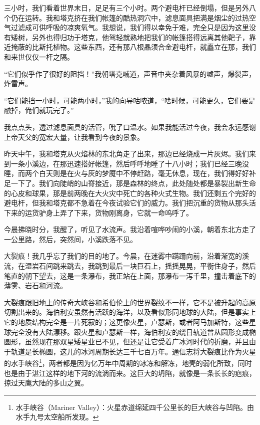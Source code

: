 \documentclass[AutoFakeBold=true]{book}
\begin{document}
三小时，我们看着世界末日，足足有三个小时。两个避电杆已经倒塌，但是另外八个仍在运转。我和塔克挤在我们帐篷的酷热洞穴中，滤息面具把满是烟尘的过热空气过滤成可供呼吸的凉爽氧气。我想说，我们得以幸免于难，完全只是因为这里没有矮树，另外也得归功于塔克，他驾轻就熟地把我们的帐篷搭得远离其他靶子，靠近掩蔽的比斯托植物。这些东西，还有那八根晶须合金避电杆，就矗立在那，我们和来世仅仅一杆之隔。

``它们似乎作了很好的阻挡！''我朝塔克喊道，声音中夹杂着风暴的嘘声，爆裂声，炸雷声。

``它们能挡一小时，可能两小时，''我的向导咕哝道，``啥时候，可能更久，它们要是融掉，俺们就玩完了。''

我点点头，透过滤息面具的活管，吮了口温水。如果我能活过今夜，我会永远感谢上帝天父的宽宏大量，让我看到今夜的景象。

\vspace*{1em}{\kaishu 第八十七日：}

昨天中午，我和塔克从火焰林的东北角走了出来，那边已经烧成一片灰烬。我们来到一条小溪边，在那迅速搭好帐篷，然后呼呼地睡了十八小时；我们已经三晚没睡，而两个白天则是在火与灰的梦魇中不停赶路，毫无休息，现在，我们得好好补足一下了。我们向陡峭的山脊接近，那是森林的终点，此处随处都是暴裂出新生命的心皮和球果，那是前两晚在大火灾中死亡的各种火式生物。我们还剩五个完好的避电杆，但我和塔克都不急着在今夜试验它们的威力。我们把沉重的货物从那头活下来的运货驴身上弄了下来，货物刚离身，它就一命呜呼了。

今晨拂晓时分，我醒了，听见了水流声。我沿着喧哗吵闹的小溪，朝着东北方走了一公里路，然后，突然间，小溪跌落不见。

大裂痕！我几乎忘了我们的目的地了。今晨，在迷雾中蹒跚向前，沿着渐宽的溪流，在湿岩石间跳来跳去，我跳到最后一块巨石上，摇摇晃晃，平衡住身子，然后笔直的朝下望去，这是一条瀑布，我正站在上面，那瀑布一泻千里，撞击着底下的薄雾、岩石和河流。

大裂痕跟旧地上的传奇大峡谷和希伯伦上的世界裂纹不一样，它不是被升起的高原切割出来的。海伯利安虽然有活跃的海洋，以及看似形同地球的大陆，但是事实上它的地质结构完全是一片死寂的；这更像火星，卢瑟斯，或者阿马加斯特，这些星球完全没有大陆漂移。跟火星和卢瑟斯一样，海伯利安的绕日轨道曾从圆形变成椭圆形，虽然现在那双星矮星业已不见，但还是让它受着广冰河时代的折磨，并且由于轨道是长椭圆，这儿的冰河周期长达三千七百万年。通信志将大裂痕比作为火星的水手峡谷\footnote{水手峡谷（Mariner Valley）：火星赤道绵延四千公里长的巨大峡谷与凹陷。由水手九号太空船所发现。}，两者都是因为亿万年中周期的冰冻和解冻，地壳的弱化所致，同时也是由于湛江这样的地下河的流淌而来。这巨大的坍陷，就像是一条长长的疤痕，掠过天鹰大陆的多山之翼。
\end{document}
